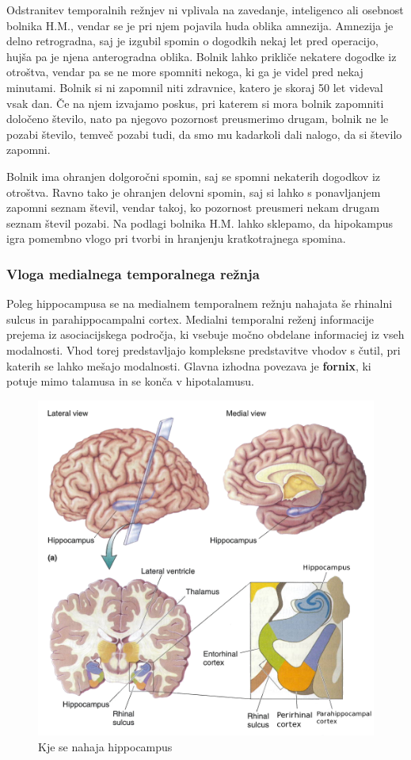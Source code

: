 \documentclass[10pt,a4paper]{article}
\begin{document}
Odstranitev temporalnih režnjev ni vplivala na zavedanje, inteligenco ali osebnost bolnika H.M., vendar se je pri njem pojavila huda oblika amnezija. Amnezija je delno retrogradna, saj je izgubil spomin o dogodkih nekaj let pred operacijo, hujša pa je njena anterogradna oblika. Bolnik lahko prikliče nekatere dogodke iz otroštva, vendar pa se ne more spomniti nekoga, ki ga je videl pred nekaj minutami. Bolnik si ni zapomnil niti zdravnice, katero je skoraj 50 let videval vsak dan. Če na njem izvajamo poskus, pri katerem si mora bolnik zapomniti določeno število, nato pa njegovo pozornost preusmerimo drugam, bolnik ne le pozabi število, temveč pozabi tudi, da smo mu kadarkoli dali nalogo, da si število zapomni.

Bolnik ima ohranjen dolgoročni spomin, saj se spomni nekaterih dogodkov iz otroštva. Ravno tako je ohranjen delovni spomin, saj si lahko s ponavljanjem zapomni seznam števil, vendar takoj, ko pozornost preusmeri nekam drugam seznam števil pozabi. Na podlagi bolnika H.M. lahko sklepamo, da hipokampus igra pomembno vlogo pri tvorbi in hranjenju kratkotrajnega spomina.

\subsubsection{Vloga medialnega temporalnega režnja}
Poleg hippocampusa se na medialnem temporalnem režnju nahajata še rhinalni sulcus in parahippocampalni cortex. Medialni temporalni reženj informacije prejema iz asociacijskega področja, ki vsebuje močno obdelane informaciej iz vseh modalnosti. Vhod torej predstavljajo kompleksne predstavitve vhodov s čutil, pri katerih se lahko mešajo modalnosti. Glavna izhodna povezava je {\bf fornix}, ki potuje mimo talamusa in se konča v hipotalamusu.

\begin{figure}[h]
  \centering
    \includegraphics[width=1.0\textwidth]{LokacijaHippocampusa.png}
  \caption{Kje se nahaja hippocampus}
  \label{sHippocampus}
\end{figure}
\end{document}
